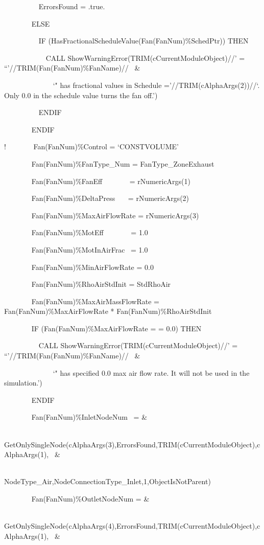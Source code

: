 ~~~~~~~~~ ErrorsFound = .true.

~~~~~~~ ELSE

~~~~~~~~~ IF (HasFractionalScheduleValue(Fan(FanNum)\%SchedPtr)) THEN

~~~~~~~~~~~ CALL ShowWarningError(TRIM(cCurrentModuleObject)//' = ``'//TRIM(Fan(FanNum)\%FanName)//~ \&

~~~~~~~~~~~~~ `" has fractional values in Schedule ='//TRIM(cAlphaArgs(2))//`. Only 0.0 in the schedule value turns the fan off.')

~~~~~~~~~ ENDIF

~~~~~~~ ENDIF

!~~~~~~~ Fan(FanNum)\%Control = `CONSTVOLUME'

~~~~~~~ Fan(FanNum)\%FanType\_Num = FanType\_ZoneExhaust

~~~~~~~ Fan(FanNum)\%FanEff~~~~~~~ = rNumericArgs(1)

~~~~~~~ Fan(FanNum)\%DeltaPress~~~ = rNumericArgs(2)

~~~~~~~ Fan(FanNum)\%MaxAirFlowRate = rNumericArgs(3)

~~~~~~~ Fan(FanNum)\%MotEff~~~~~~~ = 1.0

~~~~~~~ Fan(FanNum)\%MotInAirFrac~ = 1.0

~~~~~~~ Fan(FanNum)\%MinAirFlowRate = 0.0

~~~~~~~ Fan(FanNum)\%RhoAirStdInit = StdRhoAir

~~~~~~~ Fan(FanNum)\%MaxAirMassFlowRate = Fan(FanNum)\%MaxAirFlowRate * Fan(FanNum)\%RhoAirStdInit

~~~~~~~ IF (Fan(FanNum)\%MaxAirFlowRate = = 0.0) THEN

~~~~~~~~~ CALL ShowWarningError(TRIM(cCurrentModuleObject)//' = ``'//TRIM(Fan(FanNum)\%FanName)//~ \&

~~~~~~~~~~~~~ `" has specified 0.0 max air flow rate. It will not be used in the simulation.')

~~~~~~~ ENDIF

~~~~~~~ Fan(FanNum)\%InletNodeNum~ = \&

~~~~~~~~~~~~~~ GetOnlySingleNode(cAlphaArgs(3),ErrorsFound,TRIM(cCurrentModuleObject),cAlphaArgs(1),~ \&

~~~~~~~~~~~~~~~~~~~~~~~~~~~ NodeType\_Air,NodeConnectionType\_Inlet,1,ObjectIsNotParent)

~~~~~~~ Fan(FanNum)\%OutletNodeNum = \&

~~~~~~~~~~~~~~ GetOnlySingleNode(cAlphaArgs(4),ErrorsFound,TRIM(cCurrentModuleObject),cAlphaArgs(1),~ \&

